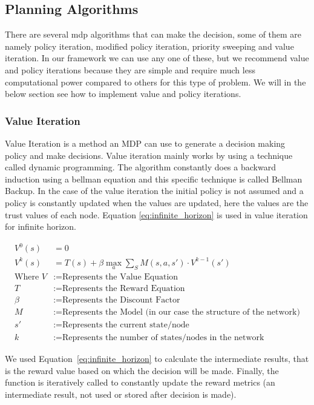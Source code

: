 \subsection{Planning Algorithms}
There are several \gls{mdp} algorithms that can make the decision, some of them are
namely policy iteration, modified policy iteration, priority sweeping and value
iteration.  In our framework we can use any one of these, but we recommend value
and policy iterations because they are simple and require much less
computational power compared to others for this type of problem. We will in the
below section see how to implement value and policy iterations.


\subsubsection{Value Iteration}
Value Iteration is a method an MDP can use to generate a decision making policy and make decisions. 
Value iteration mainly works by using a technique called dynamic
programming. The algorithm constantly does a backward induction using a bellman
equation \autocite{Wikipedia2013} and this specific technique is called Bellman Backup. In the case of the
value iteration the initial policy is not assumed and a policy is constantly
updated when the values are updated, here the values are the trust
values of each node.  Equation \ref{eq:infinite_horizon} is used in value iteration for infinite
horizon.

\begin{equation} 
    \label{eq:infinite_horizon}
    \begin{aligned}
    V^0(s) &= 0 \\
    V^k(s) &= T(s) + \beta \max_a \sum_S M(s,a,s') \cdot V^{k-1}(s') \\
    \text{Where } V &:= \text{Represents the Value Equation} \\
    T &:= \text{Represents the Reward Equation} \\
    \beta &:= \text{Represents the Discount Factor} \\
    M &:= \text{Represents the Model (in our case the structure of the network)} \\
    s' &:= \text{Represents the current state/node} \\
    k &:= \text{Represents the number of states/nodes in the network}
    \end{aligned}
\end{equation}


We used Equation~\ref{eq:infinite_horizon} to calculate the intermediate results, that is the
reward value based on which the decision will be made. Finally, the function is iteratively called to constantly update the reward
metrics (an intermediate result, not used or stored after decision is made).

